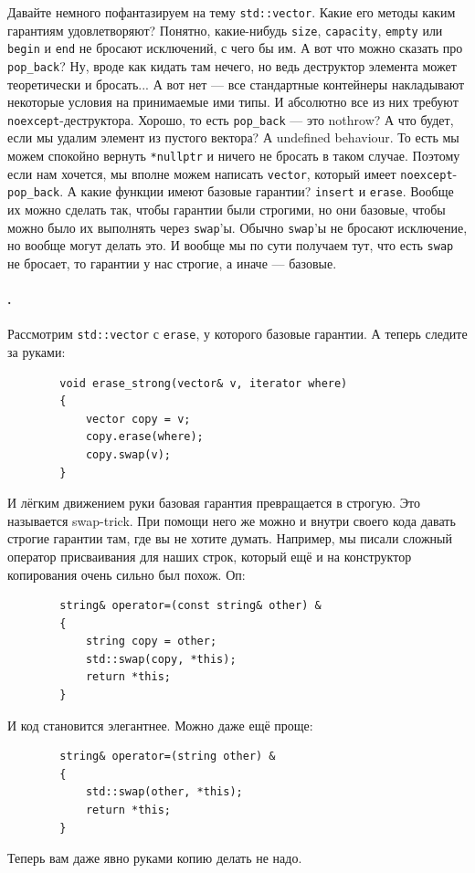 \documentclass{article}
\begin{document}
    Давайте немного пофантазируем на тему \texttt{std::vector}. Какие его методы каким гарантиям удовлетворяют? Понятно, какие-нибудь \texttt{size}, \texttt{capacity}, \texttt{empty} или \texttt{begin} и \texttt{end} не бросают исключений, с чего бы им. А вот что можно сказать про \texttt{pop_back}? Ну, вроде как кидать там нечего, но ведь деструктор элемента может теоретически и бросать... А вот нет --- все стандартные контейнеры накладывают некоторые условия на принимаемые ими типы. И абсолютно все из них требуют \texttt{noexcept}-деструктора. Хорошо, то есть \texttt{pop_back} --- это nothrow? А что будет, если мы удалим элемент из пустого вектора? А undefined behaviour. То есть мы можем спокойно вернуть \texttt{*nullptr} и ничего не бросать в таком случае. Поэтому если нам хочется, мы вполне можем написать \texttt{vector}, который имеет \texttt{noexcept}-\texttt{pop_back}. А какие функции имеют базовые гарантии? \texttt{insert} и \texttt{erase}. Вообще их можно сделать так, чтобы гарантии были строгими, но они базовые, чтобы можно было их выполнять через \texttt{swap}'ы. Обычно \texttt{swap}'ы не бросают исключение, но вообще могут делать это. И вообще мы по сути получаем тут, что есть \texttt{swap} не бросает, то гарантии у нас строгие, а иначе --- базовые.
    \paragraph{.}
    Рассмотрим \texttt{std::vector} с \texttt{erase}, у которого базовые гарантии. А теперь следите за руками:
    \begin{verbatim}
        void erase_strong(vector& v, iterator where)
        {
            vector copy = v;
            copy.erase(where);
            copy.swap(v);
        }
    \end{verbatim}
    И лёгким движением руки базовая гарантия превращается в строгую. Это называется swap-trick. При помощи него же можно и внутри своего кода давать строгие гарантии там, где вы не хотите думать. Например, мы писали сложный оператор присваивания для наших строк, который ещё и на конструктор копирования очень сильно был похож. Оп:
    \begin{verbatim}
        string& operator=(const string& other) &
        {
            string copy = other;
            std::swap(copy, *this);
            return *this;
        }
    \end{verbatim}
    И код становится элегантнее. Можно даже ещё проще:
    \begin{verbatim}
        string& operator=(string other) &
        {
            std::swap(other, *this);
            return *this;
        }
    \end{verbatim}
    Теперь вам даже явно руками копию делать не надо.
\end{document}
